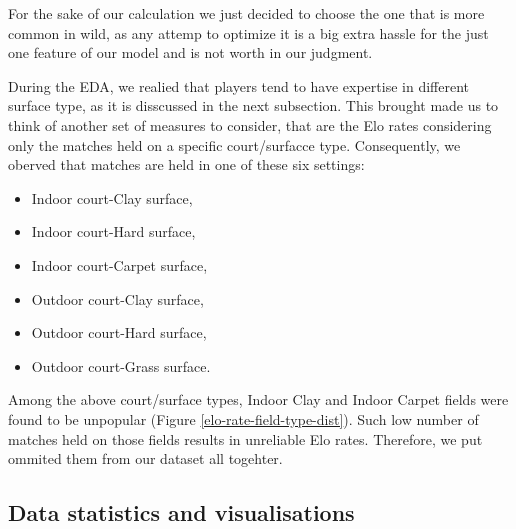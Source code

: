 \documentclass[preprint,aps,nofootinbib,a4paper,superscriptaddress,longbibliography,amsfonts,amssymb,amsmath,titlepage]{revtex4-2}
\begin{document}
For the sake of our calculation we just decided to choose the one that is more common in wild, as any attemp to optimize it is a big extra hassle for the just one feature of our model and is not worth in our judgment.

During the EDA, we realied that players tend to have expertise in different surface type, as it is disscussed in the next subsection. This brought made us to think of another set of measures to consider, that are the Elo rates considering only the matches held on a specific court/surfacce type. Consequently, we oberved that matches are held in one of these six settings:
%
\begin{itemize}
\item Indoor court-Clay surface,
\item Indoor court-Hard surface,
\item Indoor court-Carpet surface,
\item Outdoor court-Clay surface,
\item Outdoor court-Hard surface,
\item Outdoor court-Grass surface.
\end{itemize}
%

Among the above court/surface types, Indoor Clay and Indoor Carpet fields were found to be unpopular (Figure \ref{elo-rate-field-type-dist}). Such low number of matches held on those fields results in unreliable Elo rates. Therefore, we put ommited them from our dataset all togehter.

\subsection{Data statistics and visualisations}
\end{document}
